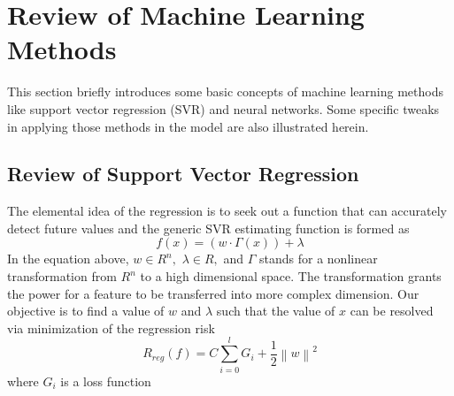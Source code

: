 \section{Review of Machine Learning Methods}

This section briefly introduces some basic concepts of machine learning methods like support vector regression (SVR) and neural networks. Some specific tweaks in applying those methods in the model are also illustrated herein.
\subsection{Review of Support Vector Regression}

The elemental idea of the regression is to seek out a function that can accurately detect future values and the generic SVR estimating function is formed as
\[
f\left( x \right) = \left( {w \cdot \Gamma \left( x \right)} \right) + \lambda
\label{eq:1}
\]
In the equation above, $w \in {R^n},$ $\lambda \in {R},$ and $\Gamma$ stands for a nonlinear transformation from $R^n$ to a high dimensional space. The transformation grants the power for a feature to be transferred into more complex dimension. Our objective is to find a value of $w$ and $\lambda$ such that the value of $x$ can be resolved via minimization of the regression risk
\[
{R_{reg}}\left( f \right) = C\sum\limits_{i = 0}^l {{G _i} + \frac{1}{2}{{\left\| w \right\|}^2}}
\label{eq:2}
\]
where ${G _i}$ is a loss function
